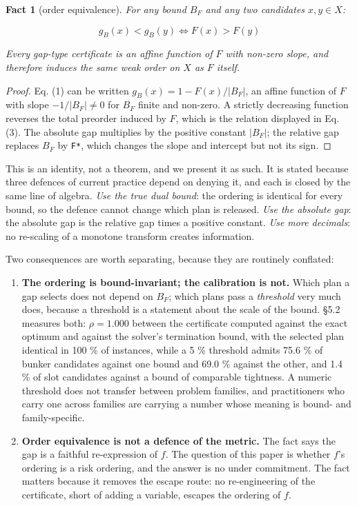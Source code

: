 \documentclass[preprint,12pt,letterpaper]{elsarticle}
\theoremstyle{definition}
\theoremstyle{plain}
\newtheorem{fact}{Fact}
\begin{document}
\begin{fact}[order equivalence]
For any bound $B_{F}$ and any two candidates $x, y \in X$:

\begin{equation}
\tag{3}
g_{B}(x) < g_{B}(y) \iff F(x) > F(y)
\end{equation}

Every gap-type certificate is an affine function of $F$ with non-zero slope, and therefore induces the same weak order on $X$ as $F$ itself.
\end{fact}

\begin{proof}
Eq. (1) can be written $g_{B}(x) = 1 - F(x)/|B_{F}|$, an affine function of $F$ with slope $-1/|B_{F}| \neq 0$ for $B_{F}$ finite and non-zero. A strictly decreasing function reverses the total preorder induced by $F$, which is the relation displayed in Eq. (3). The absolute gap multiplies by the positive constant $|B_{F}|$; the relative gap replaces $B_{F}$ by \texttt{F*}, which changes the slope and intercept but not its sign.
\end{proof}

This is an identity, not a theorem, and we present it as such. It is stated because three defences of current practice depend on denying it, and each is closed by the same line of algebra. \textit{Use the true dual bound}: the ordering is identical for every bound, so the defence cannot change which plan is released. \textit{Use the absolute gap}: the absolute gap is the relative gap times a positive constant. \textit{Use more decimals}: no re-scaling of a monotone transform creates information.

Two consequences are worth separating, because they are routinely conflated:

\begin{enumerate}
\item \textbf{The ordering is bound-invariant; the calibration is not.} Which plan a gap selects does not depend on $B_{F}$; which plans pass a \textit{threshold} very much does, because a threshold is a statement about the scale of the bound. \S 5.2 measures both: $\rho = 1.000$ between the certificate computed against the exact optimum and against the solver's termination bound, with the selected plan identical in 100 \% of instances, while a 5 \% threshold admits 75.6 \% of bunker candidates against one bound and 69.0 \% against the other, and 1.4 \% of slot candidates against a bound of comparable tightness. A numeric threshold does not transfer between problem families, and practitioners who carry one across families are carrying a number whose meaning is bound- and family-specific.
\item \textbf{Order equivalence is not a defence of the metric.} The fact says the gap is a faithful re-expression of $f$. The question of this paper is whether $f$'s ordering is a risk ordering, and the answer is no under commitment. The fact matters because it removes the escape route: no re-engineering of the certificate, short of adding a variable, escapes the ordering of $f$.
\end{enumerate}
\end{document}
